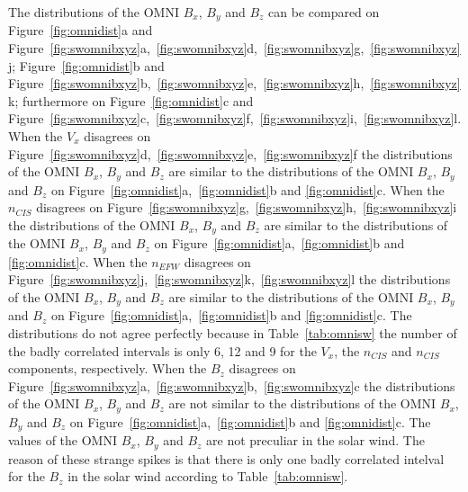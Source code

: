 \documentclass[linenumbers,draft]{agujournal}
\begin{document}
The distributions of the OMNI $B_{x}$, $B_{y}$ and $B_{z}$ can be compared on Figure~\ref{fig:omnidist}a and Figure~\ref{fig:swomnibxyz}a,~\ref{fig:swomnibxyz}d,~\ref{fig:swomnibxyz}g,~\ref{fig:swomnibxyz}j; Figure~\ref{fig:omnidist}b and Figure~\ref{fig:swomnibxyz}b,~\ref{fig:swomnibxyz}e,~\ref{fig:swomnibxyz}h,~\ref{fig:swomnibxyz}k; furthermore on Figure~\ref{fig:omnidist}c and Figure~\ref{fig:swomnibxyz}c,~\ref{fig:swomnibxyz}f,~\ref{fig:swomnibxyz}i,~\ref{fig:swomnibxyz}l. When the $V_{x}$ disagrees on Figure~\ref{fig:swomnibxyz}d,~\ref{fig:swomnibxyz}e,~\ref{fig:swomnibxyz}f the distributions of the OMNI $B_{x}$, $B_{y}$ and $B_{z}$ are similar to the distributions of the OMNI $B_{x}$, $B_{y}$ and $B_{z}$ on Figure~\ref{fig:omnidist}a,~\ref{fig:omnidist}b and \ref{fig:omnidist}c. When the $n_{CIS}$ disagrees on Figure~\ref{fig:swomnibxyz}g,~\ref{fig:swomnibxyz}h,~\ref{fig:swomnibxyz}i the distributions of the OMNI $B_{x}$, $B_{y}$ and $B_{z}$ are similar to the distributions of the OMNI $B_{x}$, $B_{y}$ and $B_{z}$ on Figure~\ref{fig:omnidist}a,~\ref{fig:omnidist}b and \ref{fig:omnidist}c. When the $n_{EFW}$ disagrees on Figure~\ref{fig:swomnibxyz}j,~\ref{fig:swomnibxyz}k,~\ref{fig:swomnibxyz}l the distributions of the OMNI $B_{x}$, $B_{y}$ and $B_{z}$ are similar to the distributions of the OMNI $B_{x}$, $B_{y}$ and $B_{z}$ on Figure~\ref{fig:omnidist}a,~\ref{fig:omnidist}b and \ref{fig:omnidist}c. The distributions do not agree perfectly because in Table~\ref{tab:omnisw} the number of the badly correlated intervals is only 6, 12 and 9 for the $V_{x}$, the $n_{CIS}$ and $n_{CIS}$ components, respectively. When the $B_{z}$ disagrees on Figure~\ref{fig:swomnibxyz}a,~\ref{fig:swomnibxyz}b,~\ref{fig:swomnibxyz}c the distributions of the OMNI $B_{x}$, $B_{y}$ and $B_{z}$ are not similar to the distributions of the OMNI $B_{x}$, $B_{y}$ and $B_{z}$ on Figure~\ref{fig:omnidist}a,~\ref{fig:omnidist}b and \ref{fig:omnidist}c. The values of the OMNI $B_{x}$, $B_{y}$ and $B_{z}$ are not preculiar in the solar wind. The reason of these strange spikes is that there is only one badly correlated intelval for the $B_{z}$ in the solar wind according to Table~\ref{tab:omnisw}.
\end{document}
